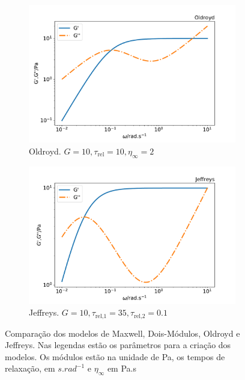 \begin{figure}[H]
				\begin{subfigure}[t]{.5\textwidth}
					\centering
					\includegraphics[width=\textwidth]{./imagens/reologia/modelos_comparativo_oldroyd}
					\caption{Oldroyd. \(G=10, \tau_{\textrm{rel}}=10, \eta_{\infty}=2\)}
					\label{fig:comparativo_modelo_oldroyd}
				\end{subfigure}%
				\begin{subfigure}[t]{.5\textwidth}
					\centering
					\includegraphics[width=\textwidth]{./imagens/reologia/modelos_comparativo_jeffreys}
					\caption{Jeffreys. \(G=10, \tau_{\textrm{rel,1}}=35, \tau_{\textrm{rel,2}}=0.1 \)}
					\label{fig:comparativo_modelo_jeffreys}
				\end{subfigure}
			
				\caption{Comparação dos modelos de Maxwell, Dois-Módulos, Oldroyd e Jeffreys. Nas legendas estão os parâmetros para a criação dos modelos. Os módulos estão na unidade de Pa, os tempos de relaxação, em \(s.rad^{-1}\) e \(\eta_{\infty}\) em Pa.s}
				\label{fig:comparativo_modelos}
			\end{figure}
			
